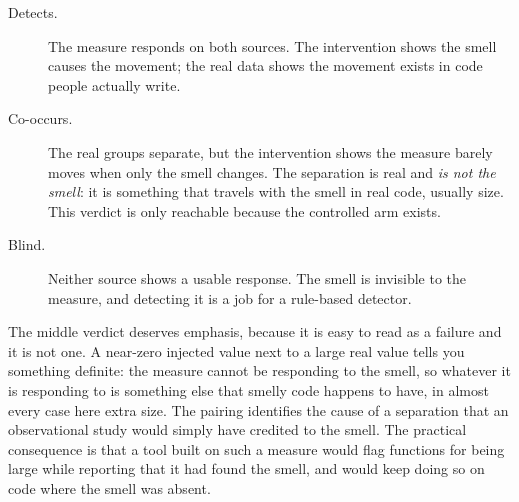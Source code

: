 \documentclass[10pt,a4paper,twocolumn]{article}
\begin{document}
\begin{description}
  \item[Detects.] The measure responds on both sources. The intervention shows
        the smell causes the movement; the real data shows the movement exists
        in code people actually write.
  \item[Co-occurs.] The real groups separate, but the intervention shows the
        measure barely moves when only the smell changes. The separation is
        real and \emph{is not the smell}: it is something that travels with
        the smell in real code, usually size. This verdict is only reachable because the controlled arm exists.
  \item[Blind.] Neither source shows a usable response. The smell is invisible
        to the measure, and detecting it is a job for a rule-based detector.
\end{description}

The middle verdict deserves emphasis, because it is easy to read as a failure
and it is not one. A near-zero injected value next to a large real value tells
you something definite: the measure cannot be responding to the smell, so whatever it is responding to is something else that smelly code happens to
have, in almost every case here extra size. The pairing identifies the cause of a
separation that an observational study would simply have credited to the smell.
The practical consequence is that a tool built on such a measure would flag
functions for being large while reporting that it had found the smell, and would
keep doing so on code where the smell was absent.
\end{document}
